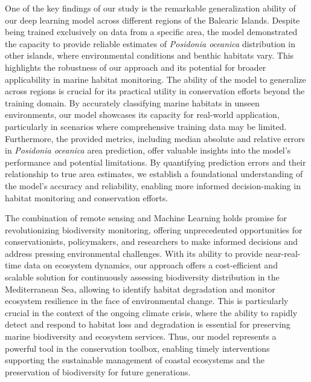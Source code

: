 One of the key findings of our study is the remarkable generalization ability
of our deep learning model across different regions of the Balearic Islands.
Despite being trained exclusively on data from a specific area, the model
demonstrated the capacity to provide reliable estimates of \textit{Posidonia
    oceanica} distribution in other islands, where environmental conditions and
benthic habitats vary. This highlights the robustness of our approach and its
potential for broader applicability in marine habitat monitoring. The ability
of the model to generalize across regions is crucial for its practical utility
in conservation efforts beyond the training domain. By accurately classifying
marine habitats in unseen environments, our model showcases its capacity for
real-world application, particularly in scenarios where comprehensive training
data may be limited. Furthermore, the provided metrics, including median
absolute and relative errors in \textit{Posidonia
    oceanica} area prediction, offer valuable insights into the model's
performance and potential limitations. By quantifying prediction errors and
their relationship to true area estimates, we establish a foundational
understanding of the model's accuracy and reliability, enabling more informed
decision-making in habitat monitoring and conservation efforts.

The combination of remote sensing and Machine Learning holds promise for
revolutionizing biodiversity monitoring, offering unprecedented opportunities
for conservationists, policymakers, and researchers to make informed decisions
and address pressing environmental challenges. With its ability to provide
near-real-time data on ecosystem dynamics, our approach offers a cost-efficient
and scalable solution for continuously assessing biodiversity distribution in
the Mediterranean Sea, allowing to identify habitat degradation and monitor
ecosystem resilience in the face of environmental change. This is particularly
crucial in the context of the ongoing climate crisis, where the ability to
rapidly detect and respond to habitat loss and degradation is essential for
preserving marine biodiversity and ecosystem services. Thus, our model
represents a powerful tool in the conservation toolbox, enabling timely
interventions supporting the sustainable management of coastal ecosystems and
the preservation of biodiversity for future generations.

